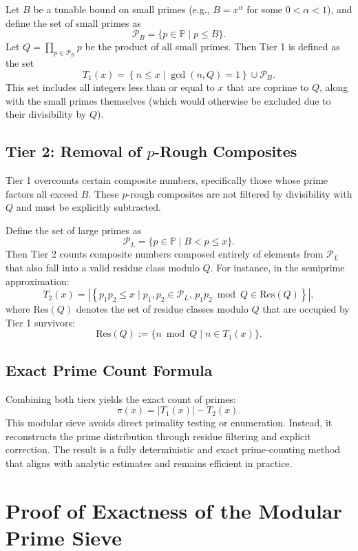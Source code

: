 \documentclass[11pt]{article}
\begin{document}
	Let \( B \) be a tunable bound on small primes (e.g., \( B = x^\alpha \) for some \( 0 < \alpha < 1 \)), and define the set of small primes as
	\[
	\mathcal{P}_B = \{p \in \mathbb{P} \mid p \leq B\}.
	\]
	Let \( Q = \prod_{p \in \mathcal{P}_B} p \) be the product of all small primes. Then Tier 1 is defined as the set
	\[
	T_1(x) = \left\{ n \leq x \mid \gcd(n, Q) = 1 \right\} \cup \mathcal{P}_B.
	\]
	This set includes all integers less than or equal to \( x \) that are coprime to \( Q \), along with the small primes themselves (which would otherwise be excluded due to their divisibility by \( Q \)).
		
	\subsection{Tier 2: Removal of \texorpdfstring{$p$}{p}-Rough Composites}
	
	Tier 1 overcounts certain composite numbers, specifically those whose prime factors all exceed \( B \). These \( p \)-rough composites are not filtered by divisibility with \( Q \) and must be explicitly subtracted.
	
	Define the set of large primes as
	\[
	\mathcal{P}_L = \{p \in \mathbb{P} \mid B < p \leq x\}.
	\]
	Then Tier 2 counts composite numbers composed entirely of elements from \( \mathcal{P}_L \) that also fall into a valid residue class modulo \( Q \). For instance, in the semiprime approximation:
	\[
	T_2(x) = \left| \left\{ p_1 p_2 \leq x \mid p_1, p_2 \in \mathcal{P}_L, \, p_1 p_2 \bmod Q \in \text{Res}(Q) \right\} \right|,
	\]
	where \( \text{Res}(Q) \) denotes the set of residue classes modulo \( Q \) that are occupied by Tier 1 survivors:
	\[
	\text{Res}(Q) := \{ n \bmod Q \mid n \in T_1(x) \}.
	\]
	
	\subsection{Exact Prime Count Formula}
	
	Combining both tiers yields the exact count of primes:
	\[
	\pi(x) = |T_1(x)| - T_2(x).
	\]
	This modular sieve avoids direct primality testing or enumeration. Instead, it reconstructs the prime distribution through residue filtering and explicit correction. The result is a fully deterministic and exact prime-counting method that aligns with analytic estimates and remains efficient in practice.
	
	
	\section{Proof of Exactness of the Modular Prime Sieve}
	
\end{document}
